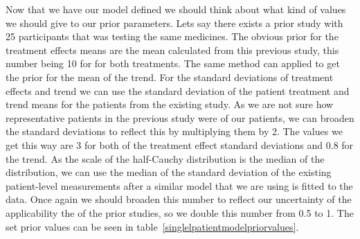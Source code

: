 \documentclass[12pt,a4paper,leqno]{report}
\theoremstyle{plain}
\theoremstyle{definition}
\theoremstyle{remark}
\begin{document}
\bigskip
{}
\bigskip

Now that we have our model defined we should think about what kind of values we should
give to our prior parameters. Lets say there exists a prior study with 25 participants
that was testing the same medicines. The obvious prior for the treatment effects means
are the mean calculated from this previous study, this number being 10 for for both
treatments. The same method can applied to get the prior for the mean of the trend. For
the standard deviations of treatment effects and trend we can use the standard deviation
of the patient treatment and trend means for the patients from the existing study. As we
are not sure how representative patients in the previous study were of our patients, we
can broaden the standard deviations to reflect this by multiplying them by 2. The values
we get this way are 3 for both of the treatment effect standard deviations and 0.8 for
the trend. As the scale of the half-Cauchy
distribution is the median of the distribution, we can use the median of
the standard deviation of the existing patient-level measurements after a similar model that we
are using is fitted to the data. Once again we should broaden this number to reflect our uncertainty of the
applicability the of the prior studies, so we double this number from 0.5 to 1.
The set prior values can be seen in table\ \ref{singlelpatientmodelpriorvalues}.
\end{document}
